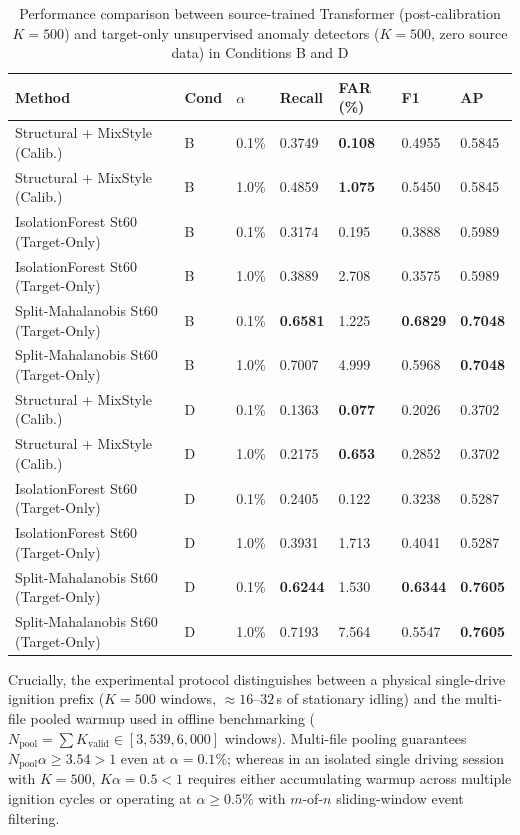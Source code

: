 \documentclass[12pt, a4paper, reqno, oneside]{book}
\begin{document}
{\renewcommand{\arraystretch}{0.85}
\begin{table}[htbp]\centering\footnotesize
\caption[Comparison between source-trained Transformer and target-only detectors]{Performance comparison between source-trained Transformer (post-calibration $K=500$) and target-only unsupervised anomaly detectors ($K=500$, zero source data) in Conditions B and D}\label{tab:target-only-summary}
\begin{tabular}{P{4.4cm}P{0.8cm}P{1.0cm}P{1.6cm}P{1.8cm}P{1.6cm}P{1.6cm}}
\toprule
Method & Cond & $\alpha$ & Recall & FAR (\%) & F1 & AP \\ \midrule
Structural + MixStyle (Calib.) & B & 0.1\% & 0.3749 & \textbf{0.108} & 0.4955 & 0.5845 \\
Structural + MixStyle (Calib.) & B & 1.0\% & 0.4859 & \textbf{1.075} & 0.5450 & 0.5845 \\
IsolationForest St60 (Target-Only) & B & 0.1\% & 0.3174 & 0.195 & 0.3888 & 0.5989 \\
IsolationForest St60 (Target-Only) & B & 1.0\% & 0.3889 & 2.708 & 0.3575 & 0.5989 \\
Split-Mahalanobis St60 (Target-Only)& B & 0.1\% & \textbf{0.6581} & 1.225 & \textbf{0.6829} & \textbf{0.7048} \\
Split-Mahalanobis St60 (Target-Only)& B & 1.0\% & 0.7007 & 4.999 & 0.5968 & \textbf{0.7048} \\
\midrule
Structural + MixStyle (Calib.) & D & 0.1\% & 0.1363 & \textbf{0.077} & 0.2026 & 0.3702 \\
Structural + MixStyle (Calib.) & D & 1.0\% & 0.2175 & \textbf{0.653} & 0.2852 & 0.3702 \\
IsolationForest St60 (Target-Only) & D & 0.1\% & 0.2405 & 0.122 & 0.3238 & 0.5287 \\
IsolationForest St60 (Target-Only) & D & 1.0\% & 0.3931 & 1.713 & 0.4041 & 0.5287 \\
Split-Mahalanobis St60 (Target-Only)& D & 0.1\% & \textbf{0.6244} & 1.530 & \textbf{0.6344} & \textbf{0.7605} \\
Split-Mahalanobis St60 (Target-Only)& D & 1.0\% & 0.7193 & 7.564 & 0.5547 & \textbf{0.7605} \\
\bottomrule
\end{tabular}
\end{table}}
Crucially, the experimental protocol distinguishes between a physical single-drive ignition prefix ($K=500$ windows, $\approx 16\text{--}32$\,s of stationary idling) and the multi-file pooled warmup used in offline benchmarking ($N_{\text{pool}} = \sum K_{\text{valid}} \in [3{,}539, 6{,}000]$ windows). Multi-file pooling guarantees $N_{\text{pool}}\alpha \ge 3.54 > 1$ even at $\alpha=0.1\%$; whereas in an isolated single driving session with $K=500$, $K\alpha = 0.5 < 1$ requires either accumulating warmup across multiple ignition cycles or operating at $\alpha \ge 0.5\%$ with $m$-of-$n$ sliding-window event filtering.
\end{document}

